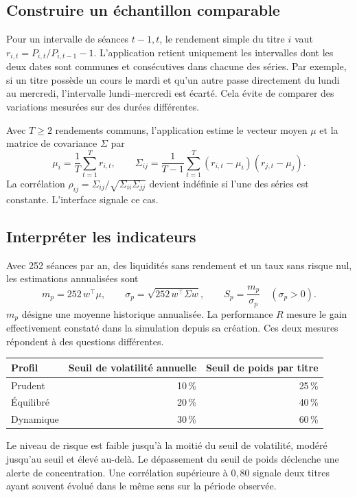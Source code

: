 \documentclass[11pt,a4paper]{article}
\begin{document}
\subsection*{Construire un échantillon comparable}
Pour un intervalle de séances $t-1,t$, le rendement simple du titre $i$ vaut $r_{i,t}=P_{i,t}/P_{i,t-1}-1$. L'application retient uniquement les intervalles dont les deux dates sont communes et consécutives dans chacune des séries. Par exemple, si un titre possède un cours le mardi et qu'un autre passe directement du lundi au mercredi, l'intervalle lundi--mercredi est écarté. Cela évite de comparer des variations mesurées sur des durées différentes.

Avec $T\geq 2$ rendements communs, l'application estime le vecteur moyen $\mu$ et la matrice de covariance $\Sigma$ par
\[
  \mu_i=\frac{1}{T}\sum_{t=1}^{T} r_{i,t},\qquad
  \Sigma_{ij}=\frac{1}{T-1}\sum_{t=1}^{T}(r_{i,t}-\mu_i)(r_{j,t}-\mu_j).
\]
La corrélation $\rho_{ij}=\Sigma_{ij}/\sqrt{\Sigma_{ii}\Sigma_{jj}}$ devient indéfinie si l'une des séries est constante. L'interface signale ce cas.

\subsection*{Interpréter les indicateurs}
Avec 252 séances par an, des liquidités sans rendement et un taux sans risque nul, les estimations annualisées sont
\[
   m_p=252\,w^\top\mu,\qquad
   \sigma_p=\sqrt{252\,w^\top\Sigma w},\qquad
   S_p=\frac{m_p}{\sigma_p}\quad(\sigma_p>0).
\]
$m_p$ désigne une moyenne historique annualisée. La performance $R$ mesure le gain effectivement constaté dans la simulation depuis sa création. Ces deux mesures répondent à des questions différentes.

\begin{center}
\begin{tabular}{@{}lrr@{}}
\toprule
Profil & Seuil de volatilité annuelle & Seuil de poids par titre \\
\midrule
Prudent & 10\,\% & 25\,\% \\
Équilibré & 20\,\% & 40\,\% \\
Dynamique & 30\,\% & 60\,\% \\
\bottomrule
\end{tabular}
\end{center}
Le niveau de risque est faible jusqu'à la moitié du seuil de volatilité, modéré jusqu'au seuil et élevé au-delà. Le dépassement du seuil de poids déclenche une alerte de concentration. Une corrélation supérieure à $0{,}80$ signale deux titres ayant souvent évolué dans le même sens sur la période observée.
\end{document}

